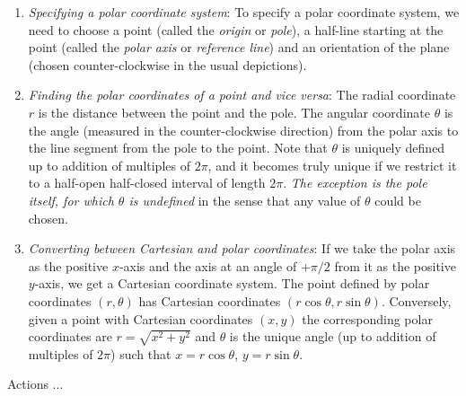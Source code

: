 \documentclass[10pt]{amsart}
\begin{document}
\begin{enumerate}
\item {\em Specifying a polar coordinate system}: To specify a polar
  coordinate system, we need to choose a point (called the {\em
  origin} or {\em pole}), a half-line starting at the point (called
  the {\em polar axis} or {\em reference line}) and an orientation of
  the plane (chosen counter-clockwise in the usual depictions).
\item {\em Finding the polar coordinates of a point and vice versa}:
  The radial coordinate $r$ is the distance between the point and the
  pole. The angular coordinate $\theta$ is the angle (measured in the
  counter-clockwise direction) from the polar axis to the line segment
  from the pole to the point. Note that $\theta$ is uniquely defined
  up to addition of multiples of $2\pi$, and it becomes truly unique
  if we restrict it to a half-open half-closed interval of length
  $2\pi$. {\em The exception is the pole itself, for which $\theta$ is
  undefined} in the sense that any value of $\theta$ could be chosen.
\item {\em Converting between Cartesian and polar coordinates}: If we
  take the polar axis as the positive $x$-axis and the axis at an
  angle of $+\pi/2$ from it as the positive $y$-axis, we get a
  Cartesian coordinate system. The point defined by polar coordinates
  $(r,\theta)$ has Cartesian coordinates $(r\cos \theta,r \sin
  \theta)$. Conversely, given a point with Cartesian coordinates
  $(x,y)$ the corresponding polar coordinates are $r = \sqrt{x^2 +
  y^2}$ and $\theta$ is the unique angle (up to addition of multiples
  of $2\pi$) such that $x = r \cos \theta$, $y = r\sin \theta$.
\end{enumerate}

Actions ...
\end{document}
